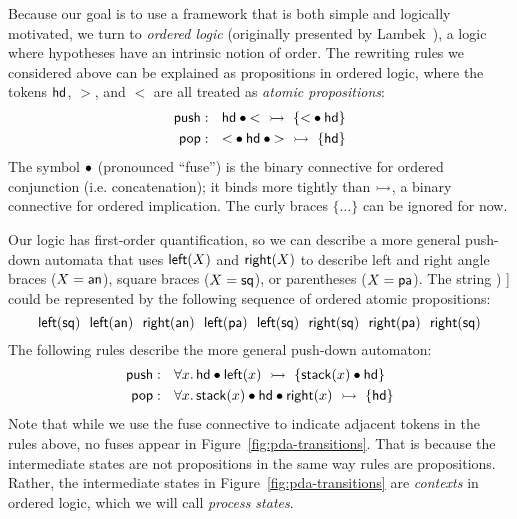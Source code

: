 Because our goal is to use a framework that is both simple and
logically motivated, we turn to {\it ordered logic} (originally
presented by Lambek~\cite{lambek58mathematics}), a logic where
hypotheses have an intrinsic notion of order. The rewriting rules
we considered above can be explained as propositions in ordered
logic, where the tokens ${\sf hd}$, $>$, and $<$ are all treated as
{\it atomic propositions}:
\begin{align*}
{\sf push} &: ~~ {\sf hd} \mathbin{\bullet} {<} ~\rightarrowtail~ \{ {<} \mathbin{\bullet} {\sf hd} \}
\\ 
{\sf pop} &: ~~ {<} \mathbin{\bullet} {\sf hd} \mathbin{\bullet} {>} ~\rightarrowtail~ \{ {\sf hd} \}
\end{align*}
The symbol $\mathbin{\bullet}$ (pronounced ``fuse'') is the binary connective for
ordered conjunction (i.e. concatenation); it binds more tightly than
$\rightarrowtail$, a binary connective for ordered implication. The curly
braces $\{ \ldots \}$ can be ignored for now.

Our logic has first-order quantification, so we can describe a more
general push-down automata that uses ${\sf left}(X)$ and ${\sf
  right}(X)$ to describe left and right angle braces ($X = {\sf an}$),
square braces ($X = {\sf sq}$), or parentheses ($X = {\sf pa}$). The
string {\sf [ \textless~\textgreater~( [ ] ) ]} could be represented
by the following sequence of ordered atomic propositions:
\[
{\sf 
  left(sq) ~~
  left(an) ~~
  right(an) ~~
  left(pa) ~~
  left(sq) ~~
  right(sq) ~~
  right(pa) ~~
  right(sq)
}
\]
The following rules describe the more general push-down automaton:
\begin{align*}
{\sf push} &: ~~ \forall x.\, 
  {\sf hd} \mathbin{\bullet} {\sf left}(x) ~\rightarrowtail~ \{ {\sf stack}(x) \mathbin{\bullet} {\sf hd} \}
\\ 
{\sf pop} &: ~~ \forall x.\, 
  {\sf stack}(x) \mathbin{\bullet} {\sf hd} \mathbin{\bullet} {\sf right}(x) ~\rightarrowtail~ \{ {\sf hd} \}
\end{align*}
Note that while we use the fuse connective to indicate adjacent tokens
in the rules above, no fuses appear in
Figure~\ref{fig:pda-transitions}. That is because the intermediate
states are not propositions in the same way rules are
propositions. Rather, the intermediate states in
Figure~\ref{fig:pda-transitions} are {\it contexts} in ordered logic,
which we will call {\it process states}. 

